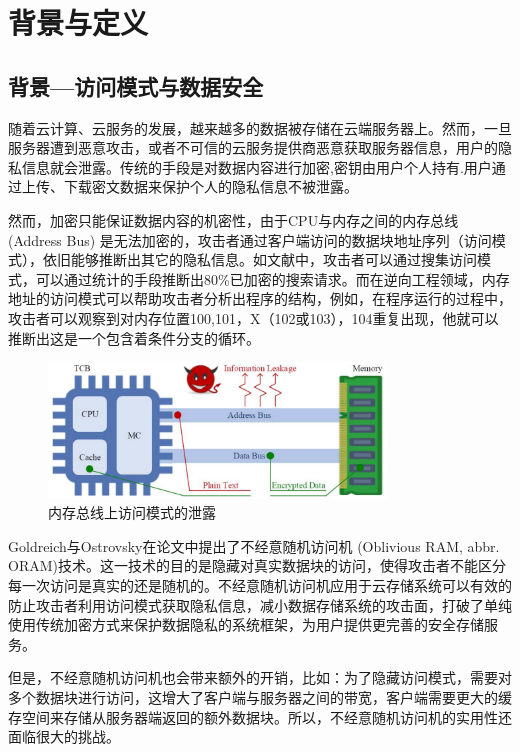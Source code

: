 \section{背景与定义}
\subsection{背景---访问模式与数据安全\cite{ref0,ref00}}\par
随着云计算、云服务的发展，越来越多的数据被存储在云端服务器上。然而，一旦服务器遭到恶意攻击，或者不可信的云服务提供商恶意获取服务器信息，用户的隐私信息就会泄露。传统的手段是对数据内容进行加密,密钥由用户个人持有.用户通过上传、下载密文数据来保护个人的隐私信息不被泄露。\par
然而，加密只能保证数据内容的机密性，由于CPU与内存之间的内存总线 (Address Bus) 是无法加密的，攻击者通过客户端访问的数据块地址序列（访问模式），依旧能够推断出其它的隐私信息。如文献\cite{ref1}中，攻击者可以通过搜集访问模式，可以通过统计的手段推断出80\%已加密的搜索请求。而在逆向工程领域\cite{ref2,ref3}，内存地址的访问模式可以帮助攻击者分析出程序的结构，例如，在程序运行的过程中，攻击者可以观察到对内存位置100,101，X（102或103），104重复出现，他就可以推断出这是一个包含着条件分支的循环。
\begin{figure}[H]
    \centering
    \includegraphics[width=0.8\textwidth]{introduction/leakage.pdf}
    \caption{内存总线上访问模式的泄露}
    \label{fig:leak}
\end{figure}
Goldreich与Ostrovsky在论文中\cite{ref4}提出了不经意随机访问机 (Oblivious RAM, abbr. ORAM)技术。这一技术的目的是隐藏对真实数据块的访问，使得攻击者不能区分每一次访问是真实的还是随机的。不经意随机访问机应用于云存储系统可以有效的防止攻击者利用访问模式获取隐私信息，减小数据存储系统的攻击面，打破了单纯使用传统加密方式来保护数据隐私的系统框架，为用户提供更完善的安全存储服务。\par%
但是，不经意随机访问机也会带来额外的开销，比如：为了隐藏访问模式，需要对多个数据块进行访问，这增大了客户端与服务器之间的带宽，客户端需要更大的缓存空间来存储从服务器端返回的额外数据块。所以，不经意随机访问机的实用性还面临很大的挑战。
